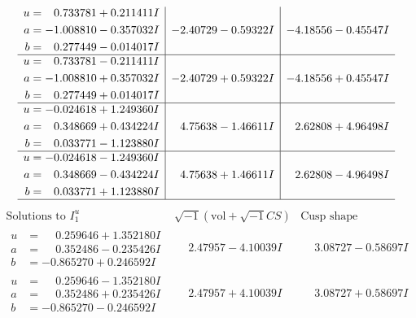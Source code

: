 \documentclass[1p]{elsarticle_modified}
\theoremstyle{definition}
\newcommand{\I}{\sqrt{-1}}
\begin{document}
$$\begin{array}{c|c|c}
\begin{aligned}
u &= \phantom{-}0.733781 + 0.211411 I \\
a &= -1.008810 - 0.357032 I \\
b &= \phantom{-}0.277449 - 0.014017 I\end{aligned}
 & -2.40729 - 0.59322 I & -4.18556 - 0.45547 I \\ \hline\begin{aligned}
u &= \phantom{-}0.733781 - 0.211411 I \\
a &= -1.008810 + 0.357032 I \\
b &= \phantom{-}0.277449 + 0.014017 I\end{aligned}
 & -2.40729 + 0.59322 I & -4.18556 + 0.45547 I \\ \hline\begin{aligned}
u &= -0.024618 + 1.249360 I \\
a &= \phantom{-}0.348669 + 0.434224 I \\
b &= \phantom{-}0.033771 - 1.123880 I\end{aligned}
 & \phantom{-}4.75638 - 1.46611 I & \phantom{-}2.62808 + 4.96498 I \\ \hline\begin{aligned}
u &= -0.024618 - 1.249360 I \\
a &= \phantom{-}0.348669 - 0.434224 I \\
b &= \phantom{-}0.033771 + 1.123880 I\end{aligned}
 & \phantom{-}4.75638 + 1.46611 I & \phantom{-}2.62808 - 4.96498 I\\
 \hline 
 \end{array}$$\newpage$$\begin{array}{c|c|c}  
\text{Solutions to }I^u_{1}& \I (\text{vol} + \sqrt{-1}CS) & \text{Cusp shape}\\
 \hline 
\begin{aligned}
u &= \phantom{-}0.259646 + 1.352180 I \\
a &= \phantom{-}0.352486 - 0.235426 I \\
b &= -0.865270 + 0.246592 I\end{aligned}
 & \phantom{-}2.47957 - 4.10039 I & \phantom{-}3.08727 - 0.58697 I \\ \hline\begin{aligned}
u &= \phantom{-}0.259646 - 1.352180 I \\
a &= \phantom{-}0.352486 + 0.235426 I \\
b &= -0.865270 - 0.246592 I\end{aligned}
 & \phantom{-}2.47957 + 4.10039 I & \phantom{-}3.08727 + 0.58697 I \\ \hline\begin{aligned}

\end{aligned}
\end{array}$$
\end{document}
